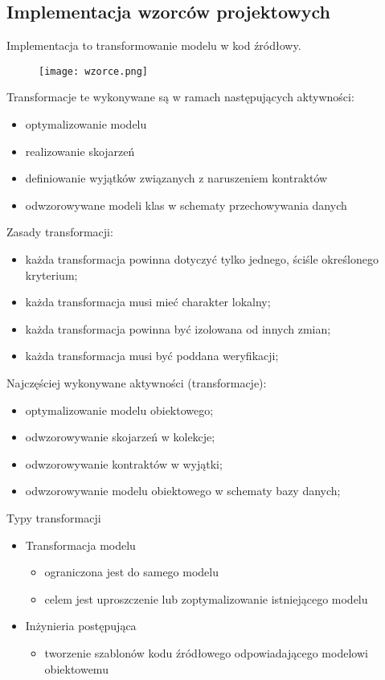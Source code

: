 \documentclass[a4paper]{article}
\begin{document}
    \subsection{Implementacja wzorców projektowych}
    Implementacja to transformowanie modelu w kod źródłowy.



    \begin{figure}[H]
        \texttt{[image: wzorce.png]}
    \end{figure}

    Transformacje te wykonywane są w ramach następujących
    aktywności:
    \begin{itemize}
        \item optymalizowanie modelu
        \item realizowanie skojarzeń
        \item definiowanie wyjątków związanych z naruszeniem kontraktów
        \item odwzorowywane modeli klas w schematy przechowywania danych
    \end{itemize}

    Zasady transformacji:
    \begin{itemize}
        \item każda transformacja powinna dotyczyć tylko jednego,
        ściśle określonego kryterium;
        \item każda transformacja musi mieć charakter lokalny;
        \item każda transformacja powinna być izolowana od
        innych zmian;
        \item każda transformacja musi być poddana weryfikacji;
    \end{itemize}


    Najczęściej wykonywane aktywności (transformacje):
    \begin{itemize}
        \item optymalizowanie modelu obiektowego;
        \item odwzorowywanie skojarzeń w kolekcje;
        \item odwzorowywanie kontraktów w wyjątki;
        \item odwzorowywanie modelu obiektowego w schematy
        bazy danych;
    \end{itemize}

    Typy transformacji
    \begin{itemize}
        \item Transformacja modelu
        \begin{itemize}
            \item ograniczona jest do samego modelu
            \item celem jest uproszczenie lub zoptymalizowanie istniejącego modelu
        \end{itemize}
        \item Inżynieria postępująca
        \begin{itemize}
            \item tworzenie szablonów kodu źródłowego odpowiadającego modelowi obiektowemu
        \end{itemize}
    \end{itemize}
\end{document}
